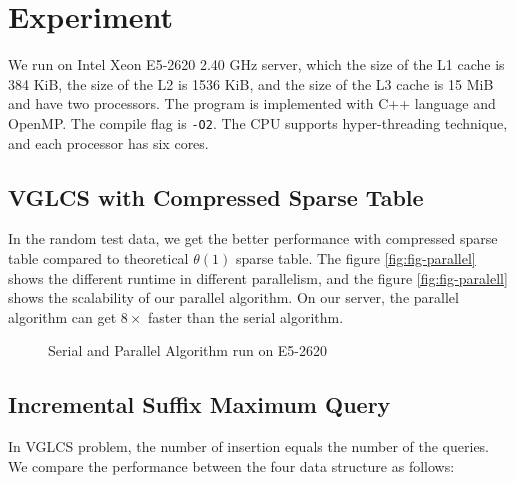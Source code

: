 \section{Experiment}
\label{sec:Experiment}

We run on Intel Xeon E5-2620 2.40 GHz server, which the size of the L1
cache is 384 KiB, the size of the L2 is 1536 KiB, and the size of the
L3 cache is 15 MiB and have two processors.  The program is
implemented with C++ language and OpenMP. The compile flag is
\texttt{-O2}.  The CPU supports hyper-threading technique, and each
processor has six cores.

\subsection{VGLCS with Compressed Sparse Table}

In the random test data, we get the better performance with compressed
sparse table compared to theoretical $\theta(1)$ sparse table.  The
figure \ref{fig:fig-parallel} shows the different runtime in different
parallelism, and the figure \ref{fig:fig-paralell} shows the
scalability of our parallel algorithm.  On our server, the parallel
algorithm can get $8 \times$ faster than the serial algorithm.

\begin{figure*}[!thb]
  \centering
  \caption{Serial and Parallel Algorithm run on E5-2620}
\end{figure*}



\subsection{Incremental Suffix Maximum Query}

In VGLCS problem, the number of insertion equals the number of the
queries. We compare the performance between the four data structure as
follows:

